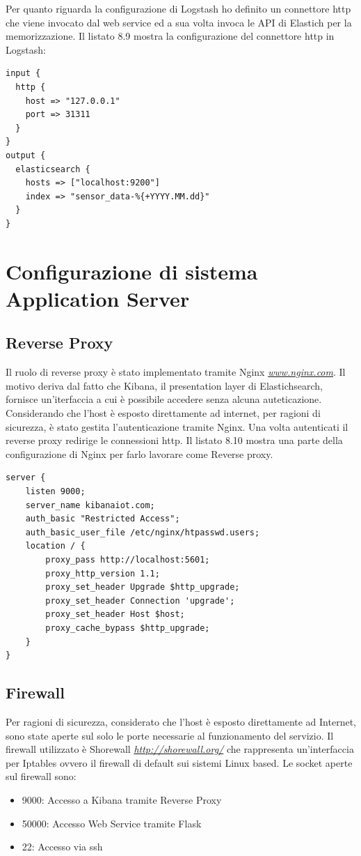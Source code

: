 \documentclass[12pt,a4paper,openright,twoside]{report}
\begin{document}
Per quanto riguarda la configurazione di Logstash ho definito un connettore http che viene invocato dal web service ed a sua volta invoca le API di Elastich per la memorizzazione. Il listato 8.9 mostra la configurazione del connettore http in Logstash:
\begin{lstlisting}
input {
  http {
    host => "127.0.0.1"
    port => 31311
  }
}
output {
  elasticsearch {
    hosts => ["localhost:9200"]
    index => "sensor_data-%{+YYYY.MM.dd}"
  }
}
\end{lstlisting}

\section{Configurazione di sistema Application Server}
\subsection{Reverse Proxy}
 Il ruolo di reverse proxy \`e stato implementato tramite Nginx \textit{\hyperref[Nginx]{www.nginx.com}}. Il motivo deriva dal fatto che Kibana, il presentation layer di Elastichsearch, fornisce un'iterfaccia a cui \`e possibile accedere senza alcuna auteticazione. Considerando che l'host \`e esposto direttamente ad internet, per ragioni di sicurezza, \`e stato gestita l'autenticazione tramite Nginx. Una volta autenticati il reverse proxy redirige le connessioni http. Il listato 8.10 mostra una parte della configurazione di Nginx per farlo lavorare come Reverse proxy.
\begin{lstlisting}
server {
    listen 9000;
    server_name kibanaiot.com;
    auth_basic "Restricted Access";
    auth_basic_user_file /etc/nginx/htpasswd.users;
    location / {
        proxy_pass http://localhost:5601;
        proxy_http_version 1.1;
        proxy_set_header Upgrade $http_upgrade;
        proxy_set_header Connection 'upgrade';
        proxy_set_header Host $host;
        proxy_cache_bypass $http_upgrade;
    }
}
\end{lstlisting}

\subsection{Firewall}
Per ragioni di sicurezza, considerato che l'host \`e esposto direttamente ad Internet, sono state aperte sul solo le porte necessarie al funzionamento del servizio. Il firewall utilizzato \`e Shorewall \textit{\hyperref[Shorewall]{http://shorewall.org/}} che rappresenta un'interfaccia per Iptables ovvero il firewall di default sui sistemi Linux based. Le socket aperte sul firewall sono:
\begin{itemize}                       
\item 9000: Accesso a Kibana tramite Reverse Proxy
\item 50000: Accesso Web Service tramite Flask
\item 22: Accesso via ssh
\end{itemize}
\end{document}
